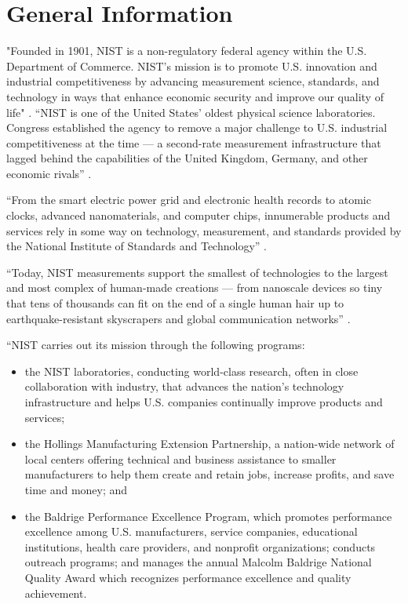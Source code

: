 \section{General Information}

"Founded in 1901, NIST is a non-regulatory federal agency within the U.S. Department of Commerce. NIST's mission is to promote U.S. innovation and industrial competitiveness by advancing measurement science, standards, and technology in ways that enhance economic security and improve our quality of life" \cite{nist2016general}.
``NIST is one of the United States' oldest physical science laboratories. Congress established the agency to remove a major challenge to U.S. industrial competitiveness at the time — a second-rate measurement infrastructure that lagged behind the capabilities of the United Kingdom, Germany, and other economic rivals'' \cite{nist2016beta}.

``From the smart electric power grid and electronic health records to atomic clocks, advanced nanomaterials, and computer chips, innumerable products and services rely in some way on technology, measurement, and standards provided by the National Institute of Standards and Technology'' \cite{nist2016general}.

``Today, NIST measurements support the smallest of technologies to the largest and most complex of human-made creations — from nanoscale devices so tiny that tens of thousands can fit on the end of a single human hair up to earthquake-resistant skyscrapers and global communication networks'' \cite{nist2016beta}.

\clearpage

``NIST carries out its mission through the following programs:
\begin{itemize}
    \item the NIST laboratories, conducting world-class research, often in close collaboration with industry, that advances the nation's technology infrastructure and helps U.S. companies continually improve products and services;
    \item the Hollings Manufacturing Extension Partnership, a nation-wide network of local centers offering technical and business assistance to smaller manufacturers to help them create and retain jobs, increase profits, and save time and money; and
    \item the Baldrige Performance Excellence Program, which promotes performance excellence among U.S. manufacturers, service companies, educational institutions, health care provi\-ders, and nonprofit organizations; conducts outreach programs; and manages the annual Malcolm Baldrige National Quality Award which recognizes performance excellence and quality achievement.
\end{itemize}

